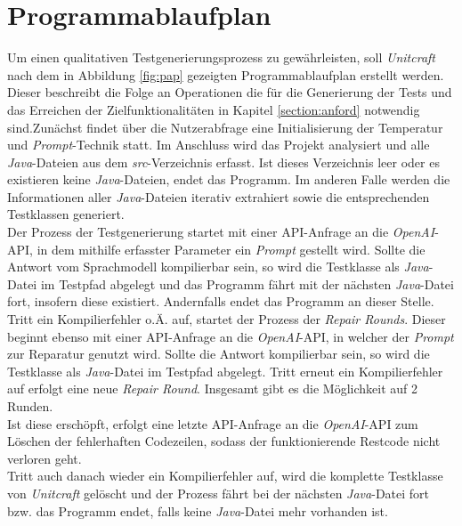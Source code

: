 \section{Programmablaufplan}
Um einen qualitativen Testgenerierungsprozess zu gewährleisten, soll \textit{Unitcraft} nach dem in Abbildung \ref{fig:pap} gezeigten Programmablaufplan erstellt werden. Dieser beschreibt die Folge an Operationen die für die Generierung der Tests und das Erreichen der Zielfunktionalitäten in Kapitel \ref{section:anford} notwendig sind.Zunächst findet über die Nutzerabfrage eine Initialisierung der Temperatur und \textit{Prompt}-Technik statt. Im Anschluss wird das Projekt analysiert und alle \textit{Java}-Dateien aus dem \textit{src}-Verzeichnis erfasst. Ist dieses Verzeichnis leer oder es existieren keine \textit{Java}-Dateien, endet das Programm. Im anderen Falle werden die Informationen aller \textit{Java}-Dateien iterativ extrahiert sowie die entsprechenden Testklassen generiert.\\Der Prozess der Testgenerierung startet mit einer API-Anfrage an die \textit{OpenAI}-API, in dem mithilfe erfasster Parameter ein \textit{Prompt} gestellt wird. Sollte die Antwort vom Sprachmodell kompilierbar sein, so wird die Testklasse als \textit{Java}-Datei im Testpfad abgelegt und das Programm fährt mit der nächsten \textit{Java}-Datei fort, insofern diese existiert. Andernfalls endet das Programm an dieser Stelle.\\Tritt ein Kompilierfehler o.Ä. auf, startet der Prozess der \textit{Repair Rounds}. Dieser beginnt ebenso mit einer API-Anfrage an die \textit{OpenAI}-API, in welcher der \textit{Prompt} zur Reparatur genutzt wird. Sollte die Antwort kompilierbar sein, so wird die Testklasse als \textit{Java}-Datei im Testpfad abgelegt. Tritt erneut ein Kompilierfehler auf erfolgt eine neue \textit{Repair Round}. Insgesamt gibt es die Möglichkeit auf 2 Runden.\\Ist diese erschöpft, erfolgt eine letzte API-Anfrage an die \textit{OpenAI}-API zum Löschen der fehlerhaften Codezeilen, sodass der funktionierende Restcode nicht verloren geht.\\Tritt auch danach wieder ein Kompilierfehler auf, wird die komplette Testklasse von \textit{Unitcraft} gelöscht und der Prozess fährt bei der nächsten \textit{Java}-Datei fort bzw. das Programm endet, falls keine \textit{Java}-Datei mehr vorhanden ist.